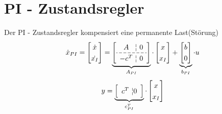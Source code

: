 



\section{PI - Zustandsregler}
Der PI - Zustandsregler kompensiert eine permanente Last(Störung)
\[
	\dot x_{PI}
	=
	\begin{bmatrix}
	\dot{x} \\
	\dot{x_I} \\
	\end{bmatrix}
	=
	\setlength{\tabcolsep}{10pt} %
	\renewcommand*{\arraystretch}{1.3} %
	\setlength{\dashlinegap}{2pt}
	\underbrace{\left[\begin{array}{c @{$ ¦ $}c}
	A    & 0  \\ \hdashline
	-c^T & 0   \\
	\end{array}\right]}_{A_{PI}}
	\cdot
	\begin{bmatrix}
	x \\
	x_I \\
	\end{bmatrix}
	+
	\underbrace{\begin{bmatrix}
	b \\
	0 \\
	\end{bmatrix}}_{b_{PI}}
	\cdot
	u
\]
\[
	y =
	\underbrace{\left[\begin{array}{c @{$ ¦$} c}
		c^T & 0
		\end{array}\right]}_{c^T_{PI}}
	\cdot
	\begin{bmatrix}
	x \\
	x_I \\
	\end{bmatrix}
\]

